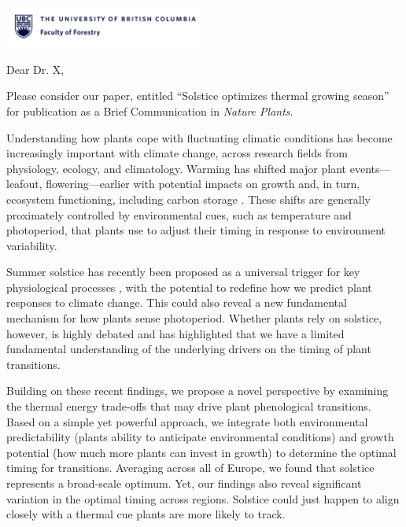 \documentclass[11pt,a4paper]{article}
\begin{document}

\noindent \includegraphics[width=0.5\textwidth, right]{forestry_letterhead.png}

\noindent Dear Dr. X,

\vspace{0.25cm}

\noindent Please consider our paper, entitled ``Solstice optimizes thermal growing season'' for publication as a Brief Communication in \emph{Nature Plants}. 

\vspace{0.25cm}

\noindent Understanding how plants cope with fluctuating climatic conditions has become increasingly important with climate change, across research fields from physiology, ecology, and climatology. Warming has shifted major plant events---leafout, flowering---earlier \supercite{Menzel2006, Fu2019} with potential impacts on growth and, in turn, ecosystem functioning, including carbon storage \supercite{Keenan2014}. These shifts are generally proximately controlled by environmental cues, such as temperature and photoperiod, that plants use to adjust their timing in response to environment variability.

\vspace{0.25cm}

\noindent Summer solstice has recently been proposed as a universal trigger for key physiological processes \supercite{Zohner2023, Journe2024}, with the potential to redefine how we predict plant responses to climate change. This could also reveal a new fundamental mechanism for how plants sense photoperiod. Whether plants rely on solstice, however, is highly debated and has highlighted that we have a limited fundamental understanding of the underlying drivers on the timing of plant transitions. 

\vspace{0.25cm}

\noindent Building on these recent findings, we propose a novel perspective by examining the thermal energy trade-offs that may drive plant phenological transitions. Based on a simple yet powerful approach, we integrate both environmental predictability (plants ability to anticipate environmental conditions) and growth potential (how much more plants can invest in growth) to determine the optimal timing for transitions. Averaging across all of Europe, we found that solstice represents a broad-scale optimum. Yet, our findings also reveal significant variation in the optimal timing across regions. Solstice could just happen to align closely with a thermal cue plants are more likely to track.
\end{document}
